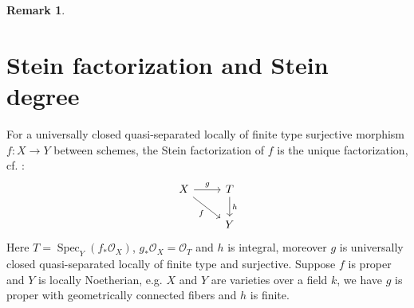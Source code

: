 \documentclass[letterpaper,reqno,12pt]{amsart}
\DeclareMathOperator{\Spec}{Spec}
\numberwithin{equation}{section}
\theoremstyle{plain}
\newtheorem{remark}{Remark}[section]
\begin{document}
\begin{remark}
\end{remark}

\section{Stein factorization and Stein degree}
For a universally closed quasi-separated locally of finite type surjective morphism $f:X\to Y$ between schemes, the Stein factorization of $f$ is the unique factorization, cf. \cite[\href{https://stacks.math.columbia.edu/tag/03GX}{Tag 03GX}]{stacks-project}:%
\[\begin{tikzcd}
	X & T \\
	& Y
	\arrow["g", from=1-1, to=1-2]
	\arrow["f"', from=1-1, to=2-2]
	\arrow["h", from=1-2, to=2-2]
\end{tikzcd}\]
Here $T=\Spec_Y(f_*\mathcal O_X)$, $g_*\mathcal O_X=\mathcal O_T$ and $h$ is integral, moreover $g$ is universally closed quasi-separated locally of finite type and surjective. Suppose $f$ is proper and $Y$ is locally Noetherian, e.g. $X$ and $Y$ are varieties over a field $k$, we have $g$ is proper with geometrically connected fibers and $h$ is finite.%
\end{document}
